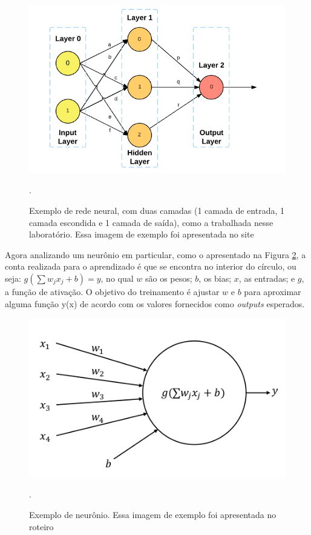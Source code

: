 \documentclass[conference]{IEEEtran}
\begin{document}
\begin{figure}[htbp]
\centering
\centerline{\includegraphics[scale=0.4]{imagens/rede_neural.png}}
\caption{Exemplo de rede neural, com duas camadas (1 camada de entrada, 1 camada escondida e 1 camada de saída), como a trabalhada nesse laboratório. Essa imagem de exemplo foi apresentada no site \cite{neural-net-np}}.
\label{rede_neural}
\end{figure}

Agora analizando um neurônio em particular, como o apresentado na Figura \ref{neuronio}, a conta realizada para o aprendizado é que se encontra no interior do círculo, ou seja: $g\left ( \sum w_j x_j + b \right ) = y$, no qual $w$ são os pesos; $b$, os bias; $x$, as entradas; e $g$, a função de ativação. O objetivo do treinamento é ajustar $w$ e $b$ para aproximar alguma função y(x) de acordo com os valores fornecidos como \textit{outputs} esperados.

\begin{figure}[htbp]
\centering
\centerline{\includegraphics[scale=0.4]{imagens/neuronio.png}}
\caption{Exemplo de neurônio. Essa imagem de exemplo foi apresentada no roteiro \cite{roteiro}}.
\label{neuronio}
\end{figure}
\end{document}
